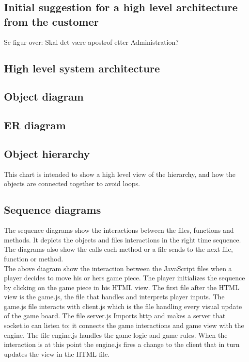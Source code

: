 \subsection{Initial suggestion for a high level architecture from the customer}
Se figur over: Skal det være apostrof etter Administration?

\subsection{High level system architecture}

\subsection{Object diagram}


\subsection{ER diagram}

\subsection{Object hierarchy}
This chart is intended to show a high level view of the hierarchy, and how the objects are connected together to avoid loops. 

\subsection{Sequence diagrams}

The sequence diagrams show the interactions between the files, functions and methods. It depicts the objects and files interactions in the right time sequence. The diagrams also show the calls each method or a file sends to the next file, function or method.  \\


The above diagram show the interaction between the JavaScript  files when a player decides to move his or hers game piece. The player initializes the sequence by clicking on the game piece in his HTML view. The first file after the HTML view is the game.js, the file that handles and interprets player inputs. The game.js file interacts with client.js which is the file handling every visual update of the game board. The file server.js Imports http and makes a server that socket.io can listen to; it connects the game interactions and game view with the engine. The file engine.js handles the game logic and game rules. When the interaction is at this point the engine.js fires a change to the client that in turn updates the view in the HTML file.\\

